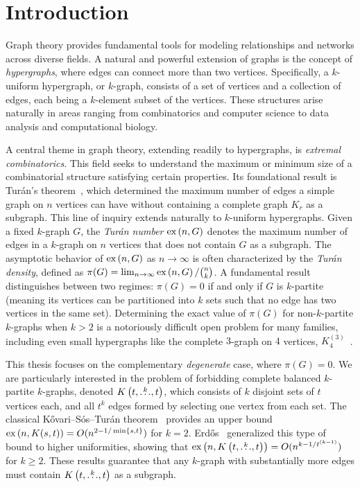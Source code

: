 \section{Introduction}\label{sec:introduction} %

Graph theory provides fundamental tools for modeling relationships and networks across diverse fields.
A natural and powerful extension of graphs is the concept of \emph{hypergraphs}, where edges can connect more than two vertices.
Specifically, a $k$-uniform hypergraph, or $k$-graph, consists of a set of vertices and a collection of edges, each being a $k$-element subset of the vertices.
These structures arise naturally in areas ranging from combinatorics and computer science to data analysis and computational biology.

A central theme in graph theory, extending readily to hypergraphs, is \emph{extremal combinatorics}.
This field seeks to understand the maximum or minimum size of a combinatorial structure satisfying certain properties.
Its foundational result is Turán's theorem~\cite{Turan1941},
which determined the maximum number of edges a simple graph on $n$
vertices can have without containing a complete graph $K_r$ as a subgraph.
This line of inquiry extends naturally to $k$-uniform hypergraphs.
Given a fixed $k$-graph $G$, the \emph{Turán number} $\text{ex} \left( n, G \right)$ denotes the maximum number of edges in a $k$-graph on $n$ vertices that does not contain $G$ as a subgraph.
The asymptotic behavior of $\text{ex} \left( n, G \right)$ as $n \to \infty$
is often characterized by the \emph{Turán density}, defined as $\pi(G) = \lim_{n \to \infty} \text{ex} \left( n, G \right) / \binom{n}{k}$.
A fundamental result distinguishes between two regimes: $\pi(G) = 0$ if and only if $G$ is $k$-partite
(meaning its vertices can be partitioned into $k$ sets such that no edge has two vertices in the same set).
Determining the exact value of $\pi(G)$ for non-$k$-partite $k$-graphs when $k > 2$
is a notoriously difficult open problem for many families, including even small hypergraphs like the complete $3$-graph on $4$ vertices,
$K_4^{(3)}$~\cite{keevash2011hypergraph, razborov20103}.

This thesis focuses on the complementary \emph{degenerate} case, where $\pi(G) = 0$.
We are particularly interested in the problem of forbidding complete balanced $k$-partite $k$-graphs,
denoted $K\left(t, \overset{k}{\dots}, t\right)$, which consists of $k$ disjoint sets of $t$ vertices each,
and all $t^k$ edges formed by selecting one vertex from each set.
The classical Kővari--Sós--Turán theorem~\cite{Kovari1954, Hylten1958} provides an upper bound $\text{ex} \left( n, K(s, t) \right) = O(n^{2 - 1/\min\{s,t\}})$ for $k=2$.
Erdős~\cite{Erods1964} generalized this type of bound to higher uniformities, showing that $\text{ex} \left( n, K\left(t, \overset{k}{\dots}, t\right) \right) = O(n^{k - 1/t^{(k-1)}})$ for $k \ge 2$.
These results guarantee that any $k$-graph with substantially more edges must contain $K\left(t, \overset{k}{\dots}, t\right)$ as a subgraph.

